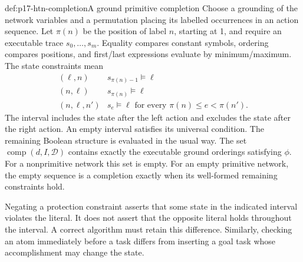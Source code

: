 \begin{hbdefinition}{def:p17-htn-completion}{A ground primitive completion}
Choose a grounding of the network variables and a permutation placing its
labelled occurrences in an action sequence. Let \(\pi(n)\) be the position
of label \(n\), starting at 1, and require an executable trace
\(s_0,\ldots,s_m\). Equality compares constant symbols, ordering compares
positions, and first/last expressions evaluate by minimum/maximum. The state
constraints mean
\[
 \begin{array}{c|l}
 (\ell,n)&s_{\pi(n)-1}\models\ell\\
 (n,\ell)&s_{\pi(n)}\models\ell\\
 (n,\ell,n')&s_e\models\ell\text{ for every }\pi(n)\leq e<\pi(n').
 \end{array}
\]
The interval includes the state after the left action and excludes the state
after the right action. An empty interval satisfies its universal condition.
The remaining Boolean structure is evaluated in the usual way. The set
\(\operatorname{comp}(d,I,\mathcal D)\) contains exactly the executable
ground orderings satisfying \(\phi\). For a nonprimitive network this set is
empty. For an empty primitive network, the empty sequence is a completion
exactly when its well-formed remaining constraints hold.
\end{hbdefinition}

Negating a protection constraint asserts that some state in the indicated
interval violates the literal. It does not assert that the opposite literal
holds throughout the interval. A correct algorithm must retain this difference.
Similarly, checking an atom immediately before a task differs from inserting
a goal task whose accomplishment may change the state.

